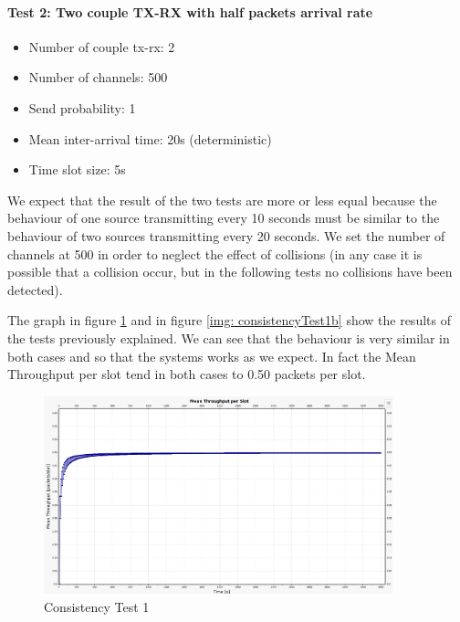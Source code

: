 \paragraph{Test 2: Two couple TX-RX with half packets arrival rate}
\begin{itemize}
	\item Number of couple tx-rx: 2
	\item Number of channels: 500
	\item Send probability: 1
	\item Mean inter-arrival time: 20s (deterministic)
	\item Time slot size: 5s
\end{itemize}

\noindent We expect that the result of the two tests are more or less equal because the behaviour of one source transmitting every 10 seconds must be similar to the behaviour of two sources transmitting every 20 seconds. We set the number of channels at 500 in order to neglect the effect of collisions (in any case it is possible that a collision occur, but in the following tests no collisions have been detected).

\noindent The graph in figure \ref{img: consistencyTest1a} and in figure \ref{img: consistencyTest1b} show the results of the tests previously explained. We can see that the behaviour is very similar in both cases and so that the systems works as we expect. In fact the Mean Throughput per slot tend in both cases to 0.50 packets per slot.

\begin{figure}[H]
	\centering
	\includegraphics[width=0.9\textwidth]{img/consistencyTest1aWithAxis.png}
	\caption{Consistency Test 1}
	\label {img: consistencyTest1a}
\end{figure}

